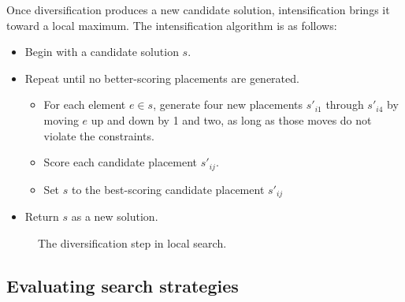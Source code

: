 \documentclass{acm_proc_article-sp}
\begin{document}
Once diversification produces a new candidate solution, intensification brings
it toward a local maximum.
The intensification algorithm is as follows:
\begin{itemize}
\item Begin with a candidate solution $s$.
\item Repeat until no better-scoring placements are generated.
\begin{itemize}
  \item For each element $e \in s$, generate four new placements $s'_{i1}$ 
  through $s'_{i4}$ by moving $e$ up and down by 1 and two, as long as those 
  moves do not violate the constraints.
  \item Score each candidate placement $s'_{ij}$.
  \item Set $s$ to the best-scoring candidate placement $s'_{ij}$
\end{itemize}
\item Return $s$ as a new solution.
\end{itemize}

\begin{figure}[htb!]
\begin{center}
   \caption{The diversification step in local search.}
   \label{diversification}
 \end{center}
\end{figure}

% 
% 
% 


\subsection{Evaluating search strategies}\label{searchstrats}
\end{document}
